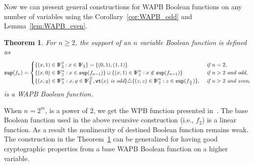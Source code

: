 \documentclass{article}[12pt]
\newtheorem{theorem}{Theorem}[section]
\newcommand{\FF}{{\rm I\!F}}
\newcommand{\wt}{\mathtt{wt}}
\newcommand{\spt}{\mathtt{sup}}
\begin{document}
Now we can present general constructions for WAPB Boolean functions on any number of variables using the  Corollary~\ref{cor:WAPB_odd} and Lemma~\ref{lem:WAPB_even}.
\begin{theorem}\label{thm:WAPB1}
    For $n \geq 2$, the support of an $n$ variable Boolean function is defined as 
	\begin{equation}\label{eq:cons1}
	\spt(f_n)=
	\begin{cases} 
	\{(x,1)\in \FF_2^2 : x \in \FF_2\} = \{(0,1),(1,1)\} & \textit{ if } n = 2, \\
	\{(x,0) \in \FF_2^n : x \in \spt(f_{n-1})\} \cup
	\{(x,1) \in \FF_2^n : x \notin \spt(f_{n-1})\} & \textit{ if } n > 2 \textit{ and odd},\\ 
	\{(x,y) \in \FF_2^n : x,y \in \FF_2^{\frac{n}{2}}, \wt(x) \textit{ is odd}\} \triangle \{(z,z) \in \FF_2^n : z \in \spt(f_{\frac{n}{2}})\}, & \textit{ if } n > 2 \textit{ and even},
	\end{cases}
	\end{equation}	
 is a WAPB Boolean function.
\end{theorem}
When $n = 2^m$, is a power of $2$, we get the WPB function presented in~\cite{MS21}. The base Boolean function used in the above recursive construction (i.e., $f_2$) is a linear function. As a result the nonlinearity of destined Boolean function remains weak.
The construction in the Theorem~\ref{thm:WAPB1} can be generalized for having good cryptographic properties from a base WAPB Boolean function on a higher variable.
\end{document}
